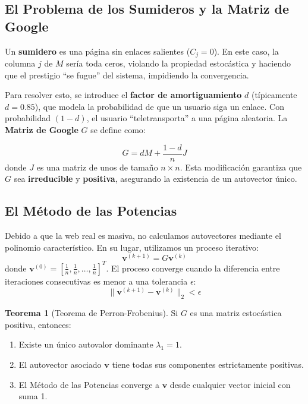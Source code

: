 \documentclass[12pt,a4paper]{article}
\theoremstyle{definition}
\newtheorem{theorem}{Teorema}[section]
\newcommand{\norm}[1]{\|#1\|}
\newcommand{\vect}[1]{\mathbf{#1}}
\begin{document}
\subsection{El Problema de los Sumideros y la Matriz de Google}

Un \textbf{sumidero} es una p\'{a}gina sin enlaces salientes ($C_j = 0$). En este caso, la columna $j$ de $M$ ser\'{i}a toda ceros, violando la propiedad estoc\'{a}stica y haciendo que el prestigio ``se fugue'' del sistema, impidiendo la convergencia.

Para resolver esto, se introduce el \textbf{factor de amortiguamiento} $d$ (t\'{i}picamente $d = 0.85$), que modela la probabilidad de que un usuario siga un enlace. Con probabilidad $(1-d)$, el usuario ``teletransporta'' a una p\'{a}gina aleatoria. La \textbf{Matriz de Google} $G$ se define como:

\begin{equation}\label{eq:matriz_G}
G = dM + \frac{1-d}{n}J
\end{equation}
donde $J$ es una matriz de unos de tama\~{n}o $n \times n$. Esta modificaci\'{o}n garantiza que $G$ sea \textbf{irreducible} y \textbf{positiva}, asegurando la existencia de un autovector \'unico.

\subsection{El M\'{e}todo de las Potencias}

Debido a que la web real es masiva, no calculamos autovectores mediante el polinomio caracter\'{i}stico. En su lugar, utilizamos un proceso iterativo:
\begin{equation}\label{eq:power_method}
\vect{v}^{(k+1)} = G \vect{v}^{(k)}
\end{equation}
donde $\vect{v}^{(0)} = [\frac{1}{n}, \frac{1}{n}, \dots, \frac{1}{n}]^T$. El proceso converge cuando la diferencia entre iteraciones consecutivas es menor a una tolerancia $\epsilon$:
\begin{equation}
\norm{\vect{v}^{(k+1)} - \vect{v}^{(k)}}_2 < \epsilon
\end{equation}

\begin{theorem}[Teorema de Perron-Frobenius]
Si $G$ es una matriz estoc\'{a}stica positiva, entonces:
\begin{enumerate}
    \item Existe un \'unico autovalor dominante $\lambda_1 = 1$.
    \item El autovector asociado $\vect{v}$ tiene todas sus componentes estrictamente positivas.
    \item El M\'{e}todo de las Potencias converge a $\vect{v}$ desde cualquier vector inicial con suma 1.
\end{enumerate}
\end{theorem}
\end{document}
